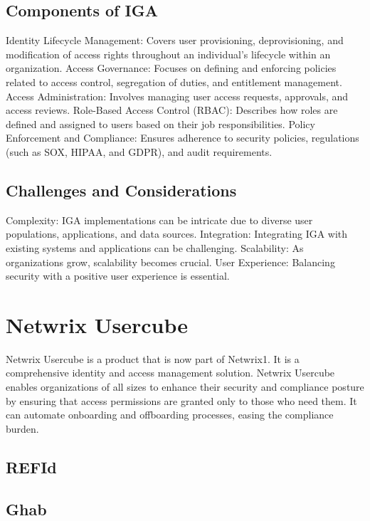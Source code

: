 \subsection{Components of IGA}
\label{sec:Template}

Identity Lifecycle Management: Covers user provisioning, deprovisioning, and modification of access rights throughout an individual’s lifecycle within an organization. Access Governance: Focuses on defining and enforcing policies related to access control, segregation of duties, and entitlement management. Access Administration: Involves managing user access requests, approvals, and access reviews. Role-Based Access Control (RBAC): Describes how roles are defined and assigned to users based on their job responsibilities. Policy Enforcement and Compliance: Ensures adherence to security policies, regulations (such as SOX, HIPAA, and GDPR), and audit requirements.

\subsection{Challenges and Considerations}
\label{sec:Template}

Complexity: IGA implementations can be intricate due to diverse user populations, applications, and data sources. Integration: Integrating IGA with existing systems and applications can be challenging. Scalability: As organizations grow, scalability becomes crucial. User Experience: Balancing security with a positive user experience is essential.

\section{Netwrix Usercube}
\label{sec:Template}

Netwrix Usercube is a product that is now part of Netwrix1. It is a comprehensive identity and access management solution. Netwrix Usercube enables organizations of all sizes to enhance their security and compliance posture by ensuring that access permissions are granted only to those who need them. It can automate onboarding and offboarding processes, easing the compliance burden.

\subsection{REFId}
\label{sec:Template}



\subsection{Ghab}
\label{sec:Template}

